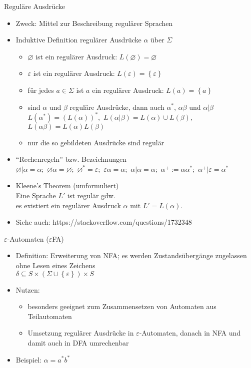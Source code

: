 \begin{frame}{Reguläre Ausdrücke}
	\begin{itemize}
		\item Zweck: Mittel zur Beschreibung regulärer Sprachen
		\item Induktive Definition regulärer Ausdrücke $\alpha$ über $\Sigma$
		\begin{itemize}
			\item $\varnothing $ ist ein regulärer Ausdruck: $L(\varnothing)=\varnothing$
			\item $\varepsilon$ ist ein regulärer Ausdruck: $L(\varepsilon)=\left\{\varepsilon\right\}$
			\item für jedes $a \in \Sigma$ ist $a$ ein regulärer Ausdruck: $L(a)=\left\{a\right\}$
			\item sind $\alpha$ und $\beta$ reguläre Ausdrücke, dann auch $\alpha^*$, $\alpha\beta$ und $\alpha | \beta$\\
			\quad $L(\alpha^*)=(L(\alpha))^*,$ $L(\alpha|\beta)=L(\alpha)\cup L(\beta),$ $L(\alpha\beta)=L(\alpha)L(\beta)$
			\item nur die so gebildeten Ausdrücke sind regulär
		\end{itemize}
		\item "`Rechenregeln"' bzw. Bezeichnungen\\
		\quad $\varnothing|\alpha=\alpha;$ $\varnothing\alpha=\varnothing;$ $\varnothing^*=\varepsilon;$ $\varepsilon\alpha=\alpha;$ $\alpha|\alpha=\alpha;$ $\alpha^+:=\alpha\alpha^*;$ $\alpha^+|\varepsilon=\alpha^*$
		\item Kleene's Theorem (umformuliert)\\
		\quad Eine Sprache $L'$ ist regulär gdw.\\
		\quad es existiert ein regulärer Ausdruck $\alpha$ mit $L'=L(\alpha)$.
		\item Siehe auch: https://stackoverflow.com/questions/1732348
	\end{itemize}
\end{frame}

\begin{frame}{$\varepsilon$-Automaten ($\varepsilon$FA)}
	\begin{itemize}
		\item Definition: Erweiterung von NFA; es werden Zustandsübergänge zugelassen ohne Lesen eines Zeichens\\
		\quad $\delta\subseteq S \times \left(\Sigma \cup \left\{\varepsilon\right\}\right) \times S$
		\item Nutzen:
		\begin{itemize}
			\item besonders geeignet zum Zusammensetzen von Automaten aus Teilautomaten
			\item Umsetzung regulärer Ausdrücke in $\varepsilon$-Automaten, danach in NFA und damit auch in DFA umrechenbar
		\end{itemize}
		\item Beispiel: $\alpha=a^*b^*$
	\end{itemize}
\end{frame}

